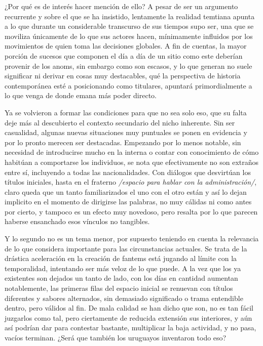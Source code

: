 \documentclass[
]{book}
\begin{document}
¿Por qué es de interés hacer mención de ello? A pesar de ser un argumento recurrente y sobre el que se ha insistido, lentamente la realidad temtiana apunta a lo que durante un considerable transcurso de sus tiempos supo ser, una que se moviliza únicamente de lo que sus actores hacen, mínimamente influidos por los movimientos de quien toma las decisiones globales. A fin de cuentas, la mayor porción de sucesos que componen el día a día de un sitio como este deberían provenir de los anoms, sin embargo como son escasos, y lo que generan no suele significar ni derivar en cosas muy destacables, qué la perspectiva de historia contemporánea esté a posicionando como titulares, apuntará primordialmente a lo que venga de donde emana más poder directo.

Ya se volvieron a formar las condiciones para que no sea solo eso, que su falta deje más al descubierto el contexto secundario del nicho inherente. Sin ser casualidad, algunas nuevas situaciones muy puntuales se ponen en evidencia y por lo pronto merecen ser destacadas. Empezando por lo menos notable, sin necesidad de introducirse mucho en la interna o contar con conocimiento de cómo habitúan a comportarse los individuos, se nota que efectivamente no son extraños entre sí, incluyendo a todas las nacionalidades. Con diálogos que desvirtúan los títulos iniciales, hasta en el fraterno \emph{/espacio para hablar con la administración/}, claro queda que un tanto familiarizados el uno con el otro están y así lo dejan implicito en el momento de dirigirse las palabras, no muy cálidas ni como antes por cierto, y tampoco es un efecto muy novedoso, pero resalta por lo que parecen haberse ensanchado esos vínculos no tangibles.

Y lo segundo no es un tema menor, por supuesto teniendo en cuenta la relevancia de lo que considera importante para las circunstancias actuales. Se trata de la drástica aceleración en la creación de fantems está jugando al límite con la temporalidad, intentando ser más veloz de lo que puede. A la vez que los ya existentes son dejados un tanto de lado, con los días en cantidad aumentan notablemente, las primeras filas del espacio inicial se renuevan con títulos diferentes y sabores alternados, sin demasiado significado o trama entendible dentro, pero válidos al fin. De mala calidad se han dicho que son, no es tan fácil juzgarlos como tal, pero ciertamente de reducida extensión sus interiores, y aún así podrían dar para contestar bastante, multiplicar la baja actividad, y no pasa, vacíos terminan. ¿Será que también los uruguayos inventaron todo eso?
\end{document}
